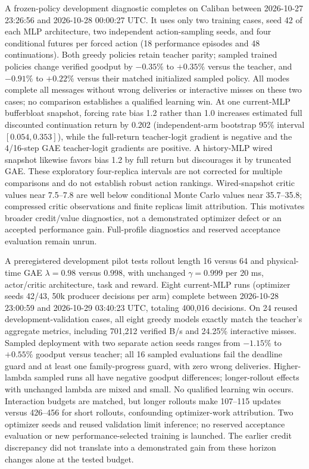 \documentclass[11pt]{article}
\begin{document}
A frozen-policy development diagnostic completes on Caliban between
2026-10-27 23:26:56 and 2026-10-28 00:00:27 UTC. It uses only two training
cases, seed 42 of each MLP architecture, two independent action-sampling seeds,
and four conditional futures per forced action (18 performance episodes and
48 continuations). Both greedy policies retain teacher parity; sampled trained
policies change verified goodput by $-0.35\%$ to $+0.35\%$ versus the teacher,
and $-0.91\%$ to $+0.22\%$ versus their matched initialized sampled policy.
All modes complete all messages without wrong deliveries or interactive misses
on these two cases; no comparison establishes a qualified learning win.
At one current-MLP bufferbloat snapshot, forcing rate bias 1.2 rather than 1.0
increases estimated full discounted continuation return by 0.202 (independent-arm
bootstrap 95\% interval $[0.054,0.353]$), while the full-return teacher-logit
gradient is negative and the 4/16-step GAE teacher-logit gradients are positive.
A history-MLP wired snapshot likewise favors bias 1.2 by full return but discourages
it by truncated GAE. These exploratory four-replica intervals are not corrected
for multiple comparisons and do not establish robust action rankings.
Wired-snapshot critic values near 7.5--7.8 are well below conditional Monte Carlo
values near 35.7--35.8; compressed critic observations and finite replicas limit
attribution. This motivates broader credit/value diagnostics, not a demonstrated
optimizer defect or an accepted performance gain. Full-profile diagnostics and
reserved acceptance evaluation remain unrun.


A preregistered development pilot tests rollout length 16 versus 64 and
physical-time GAE $\lambda=0.98$ versus $0.998$, with unchanged
$\gamma=0.999$ per 20 ms, actor/critic architecture, task and reward. Eight
current-MLP runs (optimizer seeds 42/43, 50k producer decisions per arm) complete
between 2026-10-28 23:00:59 and 2026-10-29 03:40:23 UTC, totaling 400,016 decisions.
On 24 reused development-validation cases, all eight greedy models exactly match
the teacher's aggregate metrics, including 701,212 verified B/s and 24.25\%
interactive misses. Sampled deployment with two separate action seeds ranges
from $-1.15\%$ to $+0.55\%$ goodput versus teacher; all 16 sampled evaluations
fail the deadline guard and at least one family-progress guard, with zero wrong
deliveries. Higher-lambda sampled runs all have negative goodput differences;
longer-rollout effects with unchanged lambda are mixed and small. No qualified
learning win occurs. Interaction budgets are matched, but longer rollouts make
107--115 updates versus 426--456 for short rollouts, confounding optimizer-work
attribution. Two optimizer seeds and reused validation limit inference; no
reserved acceptance evaluation or new performance-selected training is launched.
The earlier credit discrepancy did not translate into a demonstrated gain from
these horizon changes alone at the tested budget.
\end{document}
